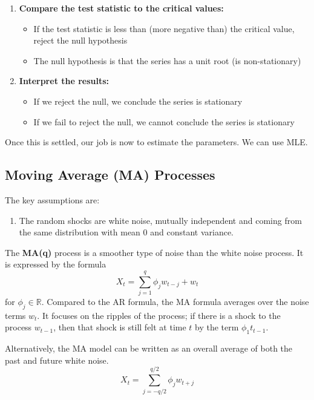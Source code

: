 \documentclass{article}
\begin{document}
\begin{definition}
\begin{enumerate}
      \item \textbf{Compare the test statistic to the critical values:}
      \begin{itemize}
          \item If the test statistic is less than (more negative than) the critical value, reject the null hypothesis
          \item The null hypothesis is that the series has a unit root (is non-stationary)
      \end{itemize}

      \item \textbf{Interpret the results:}
      \begin{itemize}
          \item If we reject the null, we conclude the series is stationary
          \item If we fail to reject the null, we cannot conclude the series is stationary
      \end{itemize}
    \end{enumerate} 
  \end{definition}

  Once this is settled, our job is now to estimate the parameters. We can use MLE. 
  
\subsection{Moving Average (MA) Processes}

  The key assumptions are: 
  \begin{enumerate}
    \item The random shocks are white noise, mutually independent and coming from the same distribution with mean $0$ and constant variance. 
  \end{enumerate}

  \begin{definition}
    \label{def:moving-average-process}
    The \textbf{MA(q)} process is a smoother type of noise than the white noise process. It is expressed by the formula 
    \begin{equation}
      X_t = \sum_{j=1}^q \phi_j w_{t-j} + w_t
    \end{equation}
    for $\phi_j \in \mathbb{R}$. Compared to the AR formula, the MA formula averages over the noise terms $w_t$. It focuses on the ripples of the process; if there is a shock to the process $w_{t-1}$, then that shock is still felt at time $t$ by the term $\phi_1 t_{t-1}$. 

    Alternatively, the MA model can be written as an overall average of both the past and future white noise. 
    \begin{equation}
      X_t = \sum_{j=-q/2}^{q/2} \phi_j w_{t +j}
    \end{equation}
  \end{definition}
\end{document}
